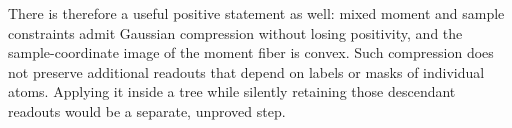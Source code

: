 \documentclass{article}
\begin{document}
There is therefore a useful positive statement as well: mixed moment
and sample constraints admit Gaussian compression without losing
positivity, and the sample-coordinate image of the moment fiber is
convex. Such compression does not preserve additional readouts that
depend on labels or masks of individual atoms. Applying it inside a
tree while silently retaining those descendant readouts would be a
separate, unproved step.
\end{document}
